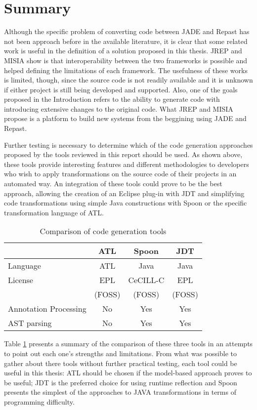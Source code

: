 \section{Summary}
Although the specific problem of converting code between JADE and Repast has not been approach before in the available literature, it is clear that some related work is useful in the definition of a solution proposed in this thesis. JREP and MISIA show is that interoperability between the two frameworks is possible and helped defining the limitations of each framework. The usefulness of these works is limited, though, since the source code is not readily available and it is unknown if either project is still being developed and supported. Also, one of the goals proposed in the Introduction refers to the ability to generate code with introducing extensive changes to the original code. What JREP and MISIA propose is a platform to build new systems from the beggining using JADE and Repast.

Further testing is necessary to determine which of the code generation approaches proposed by the tools reviewed in this report should be used. As shown above, these tools provide interesting features and different methodologies to developers who wish to apply transformations on the source code of their projects in an automated way. An integration of these tools could prove to be the best approach, allowing the creation of an Eclipse plug-in with JDT and simplifying code transformations using simple Java constructions with Spoon or the specific transformation language of ATL.

\begin{table}[h]
	\caption{Comparison of code generation tools}
	\label{tab:codetools}
	\begin{center}
		\begin{tabular}{l|ccc}
		\hline

		\hline
		\textbf{} & \textbf{ATL} & \textbf{Spoon} & \textbf{JDT} \\
		\hline
			Language & ATL 		& Java 		& Java \\
		\hline
			License & EPL 		& CeCILL-C 	& EPL \\
					& (FOSS) 	& (FOSS)	& (FOSS) \\
		\hline
			Annotation Processing & No & Yes & Yes \\
		\hline
			AST parsing & No & Yes & Yes \\
		\hline
		\end{tabular}
	\end{center}
\end{table}

Table \ref{tab:codetools} presents a summary of the comparison of these three tools in an attempts to point out each one's strengths and limitations. From what was possible to gather about there tools without further practical testing, each tool could be useful in this thesis: ATL should be chosen if the model-based approach proves to be useful; JDT is the preferred choice for using runtime reflection and Spoon presents the simplest of the approaches to JAVA transformations in terms of programming difficulty.



